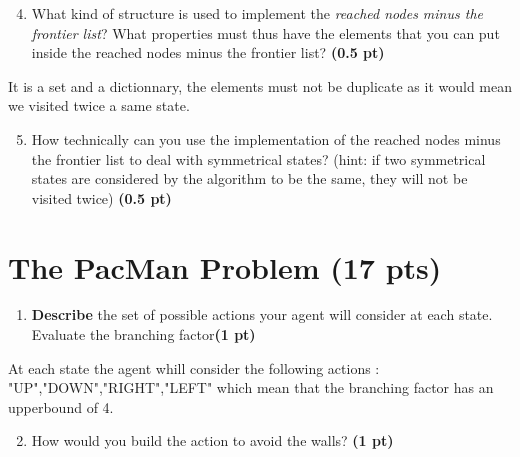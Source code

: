 \documentclass[11pt,a4paper]{../template/report}
\begin{document}
\begin{enumerate}
\setcounter{enumi}{3}
    \item What kind of structure is used to implement the \textit{reached nodes minus the frontier list}? What properties must thus have the elements that you can
	put inside the reached nodes minus the frontier list? \textbf{(0.5 pt)}
\end{enumerate}

\begin{answer}
It is a set and a dictionnary, the elements must not be duplicate as it would mean we visited twice a same state.
\end{answer}



\begin{enumerate}
\setcounter{enumi}{4}
    \item How technically can you use the implementation of the reached nodes minus the frontier list to deal with symmetrical states? (hint: if two symmetrical states are considered by the algorithm to be the same, they will not be visited twice) \textbf{(0.5 pt)}
\end{enumerate}

\begin{answer}

\end{answer}




\section{The 
PacMan Problem (17 pts)}

\begin{enumerate}
\setcounter{enumi}{1}
\begin{enumerate}
\item \textbf{Describe} the set of possible actions your agent will consider at each state. Evaluate the branching factor\textbf{(1 pt)}
\end{enumerate}
  
\end{enumerate}

\begin{answer}
At each state the agent whill consider the following actions : "UP","DOWN","RIGHT","LEFT" which mean that the branching factor has an upperbound of 4.
\end{answer}
\begin{enumerate}
\setcounter{enumi}{1}
\begin{enumerate}
\setcounter{enumii}{1}
    \item  How would you build the action to avoid the walls? \textbf{(1 pt)}
\end{enumerate}
  
\end{enumerate}
\end{document}
